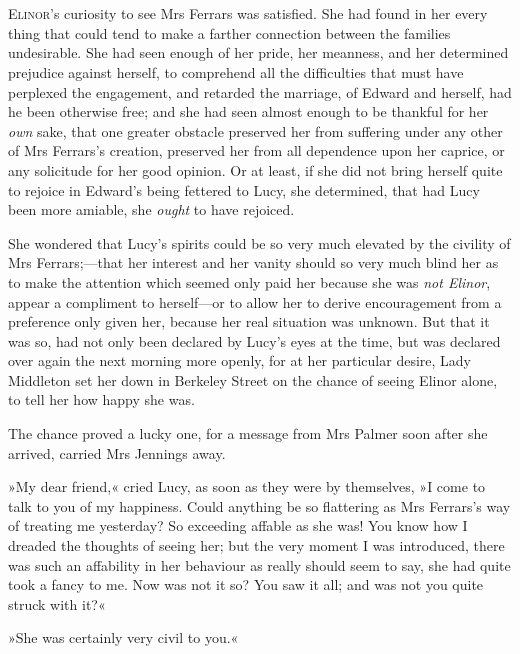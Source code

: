 \chapter[Chapter \thechapter]{}
\lettrine[lines=4,lraise=0.3]{E}{linor}’s curiosity to see Mrs Ferrars was satisfied. She had found in her every thing that could tend to make a farther connection between the families undesirable. She had seen enough of her pride, her meanness, and her determined prejudice against herself, to comprehend all the difficulties that must have perplexed the engagement, and retarded the marriage, of Edward and herself, had he been otherwise free; and she had seen almost enough to be thankful for her \textit{own} sake, that one greater obstacle preserved her from suffering under any other of Mrs Ferrars’s creation, preserved her from all dependence upon her caprice, or any solicitude for her good opinion. Or at least, if she did not bring herself quite to rejoice in Edward’s being fettered to Lucy, she determined, that had Lucy been more amiable, she \textit{ought} to have rejoiced.

She wondered that Lucy’s spirits could be so very much elevated by the civility of Mrs Ferrars;—that her interest and her vanity should so very much blind her as to make the attention which seemed only paid her because she was \textit{not Elinor}, appear a compliment to herself—or to allow her to derive encouragement from a preference only given her, because her real situation was unknown. But that it was so, had not only been declared by Lucy’s eyes at the time, but was declared over again the next morning more openly, for at her particular desire, Lady Middleton set her down in Berkeley Street on the chance of seeing Elinor alone, to tell her how happy she was.

The chance proved a lucky one, for a message from Mrs Palmer soon after she arrived, carried Mrs Jennings away.

»My dear friend,« cried Lucy, as soon as they were by themselves, »I come to talk to you of my happiness. Could anything be so flattering as Mrs Ferrars’s way of treating me yesterday? So exceeding affable as she was! You know how I dreaded the thoughts of seeing her; but the very moment I was introduced, there was such an affability in her behaviour as really should seem to say, she had quite took a fancy to me. Now was not it so? You saw it all; and was not you quite struck with it?«

»She was certainly very civil to you.«

